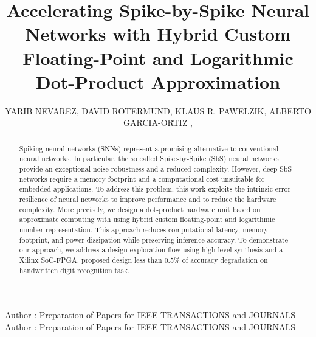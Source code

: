 \title {Accelerating Spike-by-Spike Neural Networks  with Hybrid Custom Floating-Point and Logarithmic Dot-Product Approximation }

\author{
	\uppercase{Yarib Nevarez},	
	\uppercase{David Rotermund},
	\uppercase{Klaus R. Pawelzik},
	\uppercase{Alberto Garcia-Ortiz} ,
}

\address[1]{Institute of Electrodynamics and Microelectronics, University of Bremen, Bremen 28359, Germany (e-mail: nevarez@item.uni-bremen.de)}

\address[2]{Institute for Theoretical Physics, University of Bremen, Bremen 28359, Germany (e-mail: davrot@neuro.uni-bremen.de)}

\address[3]{Institute for Theoretical Physics, University of Bremen, Bremen 28359, Germany (e-mail: pawelzik@neuro.uni-bremen.de)}

\address[4]{Institute of Electrodynamics and Microelectronics, University of Bremen, Bremen 28359, Germany (e-mail: agarcia@item.uni-bremen.de)}


\markboth
{Author \headeretal: Preparation of Papers for IEEE TRANSACTIONS and JOURNALS}
{Author \headeretal: Preparation of Papers for IEEE TRANSACTIONS and JOURNALS}


\begin{abstract}
  Spiking neural networks (SNNs) represent a promising alternative to
  conventional neural networks. In particular, the so called
  Spike-by-Spike (SbS) neural networks provide an exceptional noise
  robustness and a reduced complexity. However, deep SbS networks
  require a memory footprint and a computational cost unsuitable for
  embedded applications. To address this problem, this work exploits
  the intrinsic error-resilience of neural networks to improve
  performance and to reduce the hardware complexity. More precisely,
  we design a dot-product hardware unit based on approximate computing
  with 
  using hybrid custom floating-point and logarithmic number
  representation. This approach reduces computational latency, memory
  footprint, and power dissipation while preserving inference
  accuracy. To demonstrate our approach, we address a design
  exploration flow using high-level synthesis and a Xilinx SoC-FPGA.
   proposed design  less than
  $0.5\%$ of accuracy degradation on  handwritten digit
  recognition task.
	
\end{abstract}

